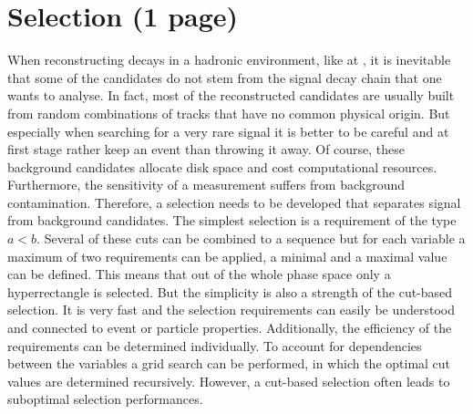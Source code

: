 
\section{Selection (1 page)}
\label{sec:dataanalysis:selection}

When reconstructing decays in a hadronic environment, like at \lhcb, it is
inevitable that some of the candidates do not stem from the signal decay chain
that one wants to analyse. In fact, most of the reconstructed candidates are
usually built from random combinations of tracks that have no common physical
origin. But especially when searching for a very rare signal it is better to
be careful and at first stage rather keep an event than throwing it away. Of
course, these background candidates allocate disk space and cost computational
resources. Furthermore, the sensitivity of a measurement suffers from
background contamination. Therefore, a selection needs to be developed that
separates signal from background candidates. The simplest selection is a
requirement of the type $a < b$. Several of these cuts can be combined to a
sequence but for each variable a maximum of two requirements can be applied,
\ie a minimal and a maximal value can be defined. This means that out of the
whole phase space only a hyperrectangle is selected. But the simplicity is
also a strength of the cut-based selection. It is very fast and the selection
requirements can easily be understood and connected to event or particle
properties. Additionally, the efficiency of the requirements can be determined
individually. To account for dependencies between the variables a grid search
can be performed, in which the optimal cut values are determined recursively.
However, a cut-based selection often leads to suboptimal selection
performances.